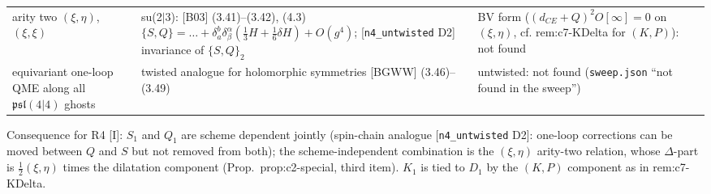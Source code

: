 \documentclass[11pt]{article}
\theoremstyle{definition}
\newcommand{\Il}{\textup{[I]}}
\begin{document}
\begin{longtable}{p{2.6cm}p{6.6cm}p{6.6cm}}
arity two $(\xi,\eta)$, $(\xi,\xi)$ & su(2$|$3): [B03] (3.41)--(3.42), (4.3) $\{S,Q\}=\dots+\delta^b_a\delta^\alpha_\beta(\frac13H+\frac16\delta H)+O(g^4)$; [\texttt{n4\_untwisted} D2] invariance of $\{S,Q\}_2$ & BV form ($(d_{CE}+Q)^2O[\infty]=0$ on $(\xi,\eta)$, cf. rem:c7-KDelta for $(K,P)$): not found\\
equivariant one-loop QME along all $\mathfrak{psl}(4|4)$ ghosts & twisted analogue for holomorphic symmetries [BGWW] (3.46)--(3.49) & untwisted: not found (\texttt{sweep.json} ``not found in the sweep'')\\
\bottomrule
\end{longtable}

Consequence for R4 \Il: $S_1$ and $Q_1$ are scheme dependent jointly (spin-chain analogue [\texttt{n4\_untwisted} D2]: one-loop corrections can be moved between $Q$ and $S$ but not removed from both); the scheme-independent combination is the $(\xi,\eta)$ arity-two relation, whose $\Delta$-part is $\tfrac12(\xi,\eta)$ times the dilatation component (Prop.~prop:c2-special, third item). $K_1$ is tied to $D_1$ by the $(K,P)$ component as in rem:c7-KDelta.
\end{document}
